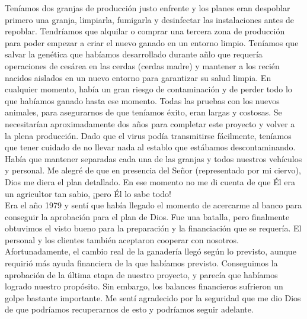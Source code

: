 \documentclass[twoside, 12pt]{book}
\begin{document}
Teníamos dos granjas de producción justo enfrente y los planes eran despoblar primero una granja, limpiarla, fumigarla y desinfectar las instalaciones antes de repoblar. Tendríamos que alquilar o comprar una tercera zona de producción para poder empezar a criar el nuevo ganado en un entorno limpio. Teníamos que salvar la genética que habíamos desarrollado durante añlo que requería operaciones de cesárea en las cerdas (cerdas madre) y mantener a los recién nacidos aislados en un nuevo entorno para garantizar su salud limpia. En cualquier momento, había un gran riesgo de contaminación y de perder todo lo que habíamos ganado hasta ese momento. Todas las pruebas con los nuevos animales, para asegurarnos de que teníamos éxito, eran largas y costosas. Se necesitarían aproximadamente dos años para completar este proyecto y volver a la plena producción. Dado que el virus podía transmitirse fácilmente, teníamos que tener cuidado de no llevar nada al establo que estábamos descontaminando. Había que mantener separadas cada una de las granjas y todos nuestros vehículos y personal. Me alegré de que en presencia del Señor (representado por mi ciervo), Dios me diera el plan detallado. En ese momento no me di cuenta de que Él era un agricultor tan sabio, ¡pero Él lo sabe todo!\\
   	
Era el año 1979 y sentí que había llegado el momento de acercarme al banco para conseguir la aprobación para el plan de Dios. Fue una batalla, pero finalmente obtuvimos el visto bueno para la preparación y la financiación que se requería. El personal y los clientes también aceptaron cooperar con nosotros. Afortunadamente, el cambio real de la ganadería llegó según lo previsto, aunque requirió más ayuda financiera de la que habíamos previsto. Conseguimos la aprobación de la última etapa de nuestro proyecto, y parecía que habíamos logrado nuestro propósito. Sin embargo, los balances financieros sufrieron un golpe bastante importante. Me sentí agradecido por la seguridad que me dio Dios de que podríamos recuperarnos de esto y podríamos seguir adelante.\\
\end{document}
